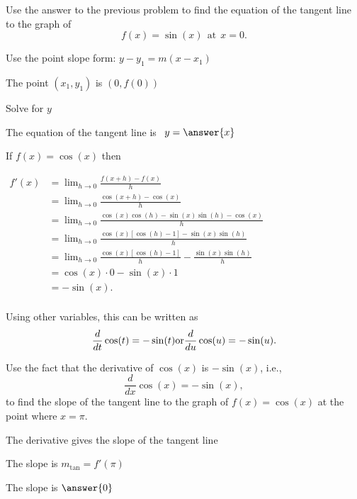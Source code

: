 \documentclass{ximera}
\begin{document}
\begin{problem} %
Use the answer to the previous problem to find the equation of the tangent line to the graph of 
\[
f(x) = \sin(x) \ \ \text{at} \ \ x=0.
\]
\begin{hint}
Use the point slope form: $y-y_1 = m(x-x_1)$
\end{hint}
\begin{hint}
The point $(x_1,y_1)$ is $(0, f(0))$
\end{hint}
\begin{hint}
Solve for $y$
\end{hint}
The equation of the tangent line is \ $y = \answer{x}$
\end{problem}


\begin{example} %
If $f(x) = \cos(x)$ then\\
\begin{center}
$\begin{aligned}
f'(x) &= \lim_{h \to 0} \frac{f(x+h)-f(x)}{h} \\[5pt]
&= \lim_{h \to 0} \frac{\cos(x+h) - \cos(x)}{h}\\[5pt]
&=  \lim_{h \to 0} \frac{\cos(x)\cos(h) - \sin(x)\sin(h) - \cos(x)}{h}\\[5pt]
&=  \lim_{h \to 0} \frac{\cos(x)[\cos(h) -1] - \sin(x)\sin(h)}{h}\\[5pt]
&=  \lim_{h \to 0} \frac{\cos(x)[\cos(h) -1]}{h} - \frac{\sin(x)\sin(h)}{h}\\[5pt]
&=   \cos(x) \cdot 0 - \sin(x)\cdot 1\\[5pt]
&= -\sin(x).\\[5pt]
\end{aligned}$
\end{center}
Using other variables, this can be written as
\[
\frac{d}{dt} \cos(t) = -\sin(t) \\
\text{or}\\
\frac{d}{du} \cos(u) = -\sin(u).
\]

\end{example}


\begin{problem} %
Use the fact that the derivative of $\cos(x)$ is $-\sin(x)$,
i.e., 
\[
\frac{d}{dx}\cos(x) = -\sin(x),
\]
to find the slope of the tangent line to the graph of 
$f(x) = \cos(x)$ at the point where $x = \pi$.\\
\begin{hint}
The derivative gives the slope of the tangent line
\end{hint}
\begin{hint}
The slope is $m_{\text{tan}} = f'(\pi)$
\end{hint}
The slope is $\answer{0}$
\end{problem}
\end{document}
